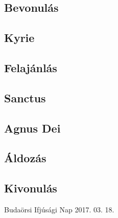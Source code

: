 \documentclass[a5paper,twoside]{article}
\begin{document}
  \begin{songs}{}
    \begin{intersong*}\section*{Bevonulás}\end{intersong*}
    
    
    \begin{intersong*}\section*{Kyrie}\end{intersong*}
    
    
%     
    
    \begin{intersong*}\section*{Felajánlás}\end{intersong*}
    
    
    \begin{intersong*}\section*{Sanctus}\end{intersong*}
    
    
    \begin{intersong*}\section*{Agnus Dei}\end{intersong*}
    
    
    \begin{intersong*}\section*{Áldozás}\end{intersong*}
    
    
    
    
    \begin{intersong*}\section*{Kivonulás}\end{intersong*}
    
  \end{songs}
  
  \newpage\null
  \vfill\hfill
  Budaörsi Ifjúsági Nap
  \newline\null\hfill
  2017. 03. 18.
\end{document}
